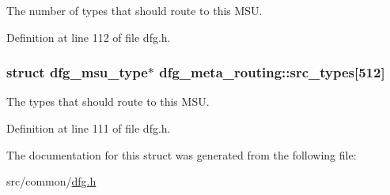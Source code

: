 The number of types that should route to this M\-S\-U. 



Definition at line 112 of file dfg.\-h.

\hypertarget{structdfg__meta__routing_afee7eace401506a5212d4dfd2fafbfcf}{
\subsubsection[{src\-\_\-types}]{\setlength{\rightskip}{0pt plus 5cm}struct {\bf dfg\-\_\-msu\-\_\-type}$\ast$ dfg\-\_\-meta\-\_\-routing\-::src\-\_\-types\mbox{[}512\mbox{]}}}\label{structdfg__meta__routing_afee7eace401506a5212d4dfd2fafbfcf}


The types that should route to this M\-S\-U. 



Definition at line 111 of file dfg.\-h.



The documentation for this struct was generated from the following file\-:\begin{DoxyCompactItemize}
\item 
src/common/\hyperlink{dfg_8h}{dfg.\-h}\end{DoxyCompactItemize}
